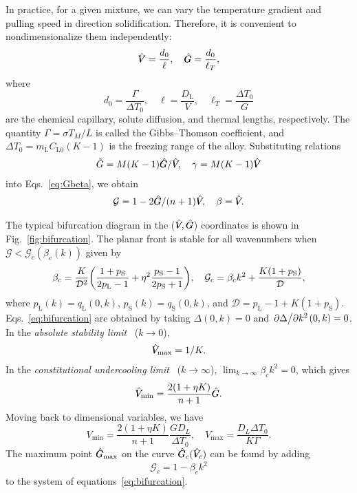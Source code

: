 \documentclass{article}
\newcommand{\liq}{\text{L}}
\newcommand{\sol}{\text{S}}
\newcommand{\qL}{q_\liq}
\newcommand{\qS}{q_\sol}
\newcommand{\pL}{p_\liq}
\newcommand{\pS}{p_\sol}
\newcommand{\hV}[1][\qty(\bar{V})]{\vphantom{#1}\mathrlap{\smash{\hat{V}}}V}
\newcommand{\hG}[1][\qty(\bar{G})]{\vphantom{#1}\mathrlap{\smash{\hat{G}}}G}
\begin{document}
In practice, for a given mixture, we can vary the temperature gradient and pulling speed in direction solidification.
Therefore, it is convenient to nondimensionalize them independently:
\begin{equation}\label{eq:hatGV}
    \hV = \frac{d_0}{\ell}, \quad \hG = \frac{d_0}{\ell_T},
\end{equation}
where
\begin{equation}\label{eq:lengths}
    d_0 = \frac{\Gamma}{\Delta{T}_0}, \quad
    \ell = \frac{D_\liq}{V}, \quad \ell_T = \frac{\Delta{T}_0}{G}
\end{equation}
are the chemical capillary, solute diffusion, and thermal lengths, respectively.
The quantity $\Gamma = \sigma T_M/L$ is called the Gibbs--Thomson coefficient,
and $\Delta{T}_0 = m_\liq C_{\liq0}(K-1)$ is the freezing range of the alloy.
Substituting relations
\begin{equation}\label{eq:tildeGgamma}
    \tilde{G} = M(K-1)\hG/\hV, \quad \gamma = M(K-1)\hV
\end{equation}
into Eqs.~\eqref{eq:Gbeta}, we obtain
\begin{equation}\label{eq:Gbeta2}
    \mathcal{G} = 1 - 2\hG/(n+1)\hV, \quad \beta = \hV.
\end{equation}

The typical bifurcation diagram in the ($\hV,\hG$) coordinates is shown in Fig.~\ref{fig:bifurcation}.
The planar front is stable for all wavenumbers when $\mathcal{G} < \mathcal{G}_c(\beta_c(k))$ given by
\begin{equation}\label{eq:bifurcation}
    \beta_c = \frac{K}{\mathcal{D}^2}\qty(\frac{1+\pS}{2\pL-1} + \eta^2\frac{\pS-1}{2\pS+1}), \quad
    \mathcal{G}_c = \beta_c k^2 + \frac{K(1+\pS)}{\mathcal{D}},
\end{equation}
where $\pL(k)=\qL(0,k)$, $\pS(k)=\qS(0,k)$, and $\mathcal{D} = \pL-1 + K(1+\pS)$.
Eqs.~\eqref{eq:bifurcation} are obtained by taking $\Delta(0,k)=0$ and ${\pdv*{\Delta}{k^2}}(0,k)=0$.
In the \emph{absolute stability limit}~\cite{mullins1964stability} ($k\to0$),
\begin{equation}\label{eq:Vmax}
    \hV_\text{max} = 1/K.
\end{equation}
In the \emph{constitutional undercooling limit}~\cite{tiller1953redistribution} ($k\to\infty$),
$\lim_{k\to\infty}\beta_ck^2 = 0$, which gives
\begin{equation}\label{eq:Vmin}
    \hV_\text{min} = \frac{2(1+\eta K)}{n+1}\hG.
\end{equation}
Moving back to dimensional variables, we have
\begin{equation}\label{eq:Vminmax}
    V_\text{min} = \frac{2(1+\eta K)}{n+1}\frac{GD_L}{\Delta{T}_0}, \quad
    V_\text{max} = \frac{D_L\Delta{T}_0}{K\Gamma}.
\end{equation}
The maximum point $\hG_\text{max}$ on the curve $\hG_c(\hV_c)$ can be found by adding
\begin{equation}\label{eq:Gmax}
    \mathcal{G}_c = 1 - \beta_ck^2
\end{equation}
to the system of equations~\eqref{eq:bifurcation}.
\end{document}
